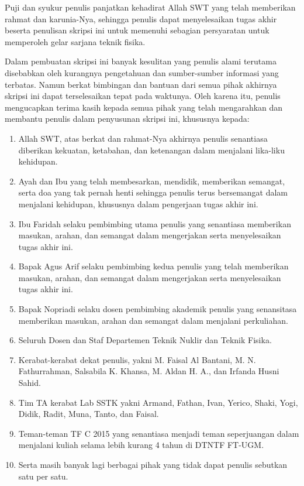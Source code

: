 Puji dan syukur penulis panjatkan kehadirat Allah SWT yang telah memberikan rahmat dan karunia-Nya, sehingga penulis dapat menyelesaikan tugas akhir beserta penulisan skripsi ini untuk memenuhi sebagian persyaratan untuk memperoleh gelar sarjana teknik fisika.

Dalam pembuatan skripsi ini banyak kesulitan yang penulis alami terutama disebabkan oleh kurangnya pengetahuan dan sumber-sumber informasi yang terbatas. Namun berkat bimbingan dan bantuan dari semua pihak akhirnya skripsi ini dapat terselesaikan tepat pada waktunya. Oleh karena itu, penulis mengucapkan terima kasih kepada semua pihak yang telah mengarahkan dan membantu penulis dalam penyusunan skripsi ini, khususnya kepada:

\begin{enumerate}
	\item Allah SWT, atas berkat dan rahmat-Nya akhirnya penulis senantiasa diberikan kekuatan, ketabahan, dan ketenangan dalam menjalani lika-liku kehidupan.
	\item Ayah dan Ibu yang telah membesarkan, mendidik, memberikan semangat, serta doa yang tak pernah henti sehingga penulis terus bersemangat dalam menjalani kehidupan, khususnya dalam pengerjaan tugas akhir ini.
	\item Ibu Faridah selaku pembimbing utama penulis yang senantiasa memberikan masukan, arahan, dan semangat dalam mengerjakan serta menyelesaikan tugas akhir ini.
	\item Bapak Agus Arif selaku pembimbing kedua penulis yang telah memberikan masukan, arahan, dan semangat dalam mengerjakan serta menyelesaikan tugas akhir ini.
	\item Bapak Nopriadi selaku dosen pembimbing akademik penulis yang senansitasa memberikan masukan, arahan dan semangat dalam menjalani perkuliahan.
	\item Seluruh Dosen dan Staf Departemen Teknik Nuklir dan Teknik Fisika.
	\item Kerabat-kerabat dekat penulis, yakni M. Faisal Al Bantani, M. N. Fathurrahman, Salsabila K. Khansa, M. Aldan H. A., dan Irfanda Husni Sahid.	
	\item Tim TA kerabat Lab SSTK yakni Armand, Fathan, Ivan, Yerico, Shaki, Yogi, Didik, Radit, Muna, Tanto, dan Faisal.
	\item Teman-teman TF C 2015 yang senantiasa menjadi teman seperjuangan dalam menjalani kuliah selama lebih kurang 4 tahun di DTNTF FT-UGM.
	\item Serta masih banyak lagi berbagai pihak yang tidak dapat penulis sebutkan satu per satu.
\end{enumerate}

